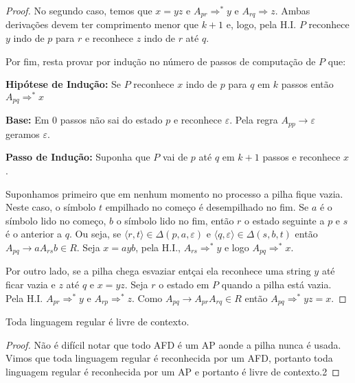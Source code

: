 \begin{proof}
No segundo caso, temos que $x = yz$ e $A_{pr} \Rightarrow^* y$ e $A_{rq} \Rightarrow z$.
Ambas derivações devem ter comprimento menor que $k + 1$ e, logo, pela H.I. $P$ reconhece $y$ indo de $p$ para $r$ e reconhece $z$ indo de $r$ até $q$.

Por fim, resta provar por indução no número de passos de computação de $P$ que:

{\bf Hipótese de Indução:} Se $P$ reconhece $x$ indo de $p$ para $q$ em $k$ passos então $A_{pq} \Rightarrow^* x$

{\bf Base:} Em $0$ passos não sai do estado $p$ e reconhece $\varepsilon$.
Pela regra $A_{pp} \to \varepsilon$ geramos $\varepsilon$.

{\bf Passo de Indução:} Suponha que $P$ vai de $p$ até $q$ em $k+1$ passos e reconhece $x$.

Suponhamos primeiro que em nenhum momento no processo a pilha fique vazia.
Neste caso, o símbolo $t$ empilhado no começo é desempilhado no fim.
Se $a$ é o símbolo lido no começo, $b$ o símbolo lido no fim, então $r$ o estado seguinte a $p$ e $s$ é o anterior a $q$.
Ou seja, se $\langle r,t \rangle \in \Delta(p, a, \varepsilon)$ e $\langle q, \varepsilon \rangle \in \Delta(s, b, t)$ então $A_{pq} \to a A_{rs} b \in R$.
Seja $x = ayb$, pela H.I., $A_{rs} \Rightarrow^* y$ e logo $A_{pq} \Rightarrow^* x$.

Por outro lado, se a pilha chega esvaziar entçai ela reconhece uma string $y$ até ficar vazia e $z$ até $q$ e $x = yz$.
Seja $r$ o estado em $P$ quando a pilha está vazia.
Pela H.I. $A_{pr} \Rightarrow^* y$ e $A_{rp} \Rightarrow^* z$.
Como $A_{pq} \to A_{pr} A_{rq} \in R$ então $A_{pq} \Rightarrow^* yz = x$.  
\end{proof}


\begin{corollary}
  Toda linguagem regular é livre de contexto.
\end{corollary}
\begin{proof}
  Não é difícil notar que todo AFD é um AP aonde a pilha nunca é usada.
  Vimos que toda linguagem regular é reconhecida por um AFD, portanto toda linguagem regular é reconhecida por um AP e portanto é livre de contexto.2
\end{proof}

